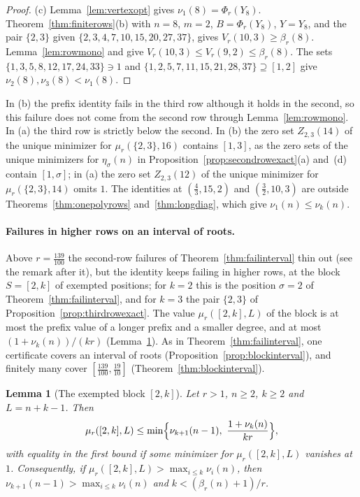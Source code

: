 \documentclass[11pt]{article}
\newtheorem{lemma}[theorem]{Lemma}
\begin{document}
\begin{proof}
(c) Lemma~\ref{lem:vertexopt} gives $\nu_1(8)=\Phi_r(Y_8)$.
Theorem~\ref{thm:finiterows}(b) with $n=8$, $m=2$, $B=\Phi_r(Y_8)$, $Y=Y_8$,
and the pair $\{2,3\}$ given $\{2,3,4,7,10,15,20,27,37\}$, gives
$V_r(10,3)\ge\beta_r(8)$.  Lemma~\ref{lem:rowmono} and
\cite[Proposition~2.1(c)]{coefficient-mass-rows} give
$V_r(10,3)\le V_r(9,2)\le\beta_r(8)$.  The sets
$\{1,3,5,8,12,17,24,33\}\ni1$ and $\{1,2,5,7,11,15,21,28,37\}\supseteq[1,2]$
give $\nu_2(8),\nu_3(8)<\nu_1(8)$.
\end{proof}

In (b) the prefix identity fails in the third row although it holds in the
second, so this failure does not come from the second row through
Lemma~\ref{lem:rowmono}.  In (a) the third row is strictly below the
second.  In (b) the zero set $Z_{2,3}(14)$ of the unique minimizer for
$\mu_r(\{2,3\},16)$ contains $[1,3]$, as the zero sets of the unique
minimizers for $\eta_\sigma(n)$ in Proposition~\ref{prop:secondrowexact}(a)
and~(d) contain $[1,\sigma]$; in (a) the zero set $Z_{2,3}(12)$ of the
unique minimizer for $\mu_r(\{2,3\},14)$ omits $1$.  The identities at
$(\frac43,15,2)$ and $(\frac32,10,3)$ are outside
Theorems~\ref{thm:onepolyrows} and~\ref{thm:longdiag}, which give
$\nu_1(n)\le\nu_k(n)$.

\paragraph{Failures in higher rows on an interval of roots.}
Above $r=\frac{139}{100}$ the second-row failures of
Theorem~\ref{thm:failinterval} thin out (see the remark after it), but the
identity keeps failing in higher rows, at the block $S=[2,k]$ of exempted
positions; for $k=2$ this is the position $\sigma=2$ of
Theorem~\ref{thm:failinterval}, and for $k=3$ the pair $\{2,3\}$ of
Proposition~\ref{prop:thirdrowexact}.  The value $\mu_r([2,k],L)$ of the
block is at most the prefix value of a longer prefix and a smaller degree,
and at most $(1+\nu_k(n))/(kr)$ (Lemma~\ref{lem:block}).  As in Theorem~\ref{thm:failinterval}, one
certificate covers an interval of roots (Proposition~\ref{prop:blockinterval}),
and finitely many cover $[\frac{139}{100},\frac{19}{10}]$
(Theorem~\ref{thm:blockinterval}).

\begin{lemma}[The exempted block {$[2,k]$}]\label{lem:block}
Let $r>1$, $n\ge2$, $k\ge2$ and $L=n+k-1$.  Then
\[
  \mu_r([2,k],L)\le\min\Bigl\{\nu_{k+1}(n-1),\ \frac{1+\nu_k(n)}{kr}\Bigr\},
\]
with equality in the first bound if some minimizer for $\mu_r([2,k],L)$
vanishes at $1$.  Consequently, if $\mu_r([2,k],L)>\max_{i\le k}\nu_i(n)$,
then $\nu_{k+1}(n-1)>\max_{i\le k}\nu_i(n)$ and $k<(\beta_r(n)+1)/r$.
\end{lemma}
\end{document}
